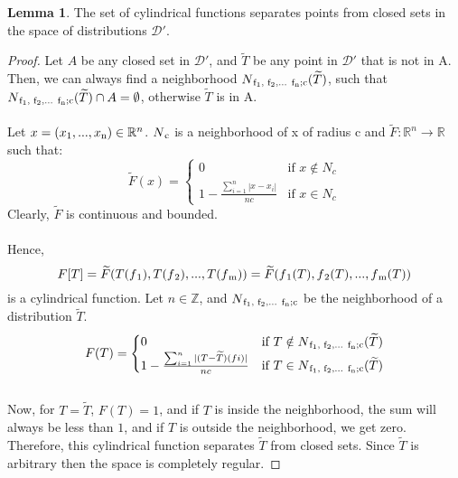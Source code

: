 \documentclass{article}
\theoremstyle{definition}
\newtheorem{lemma}{Lemma}
\begin{document}
\begin{lemma}
    The set of cylindrical functions separates points from closed sets in the space of distributions $\mathcal{D'}$.
\end{lemma}
\begin{proof}
    Let $A$ be any closed set in $\mathcal{D'}$, and $\widetilde{T}$ be any point in $\mathcal{D'}$ that is not in A. Then, we can always find a neighborhood $N\textsubscript{f\textsubscript{1}, f\textsubscript{2},... f\textsubscript{n};c}(\widetilde{T})$, such that $N\textsubscript{f\textsubscript{1}, f\textsubscript{2},... f\textsubscript{n};c}(\widetilde{T}) \cap A = \emptyset$, otherwise $\widetilde{T}$ is in A.\\\\
    Let $x=(x\textsubscript{1},..., x\textsubscript{n}) \in \mathbb{R}^n$. $N\textsubscript{c}$ is a neighborhood of x of radius c and $\widetilde{F} : \mathbb{R}^n \rightarrow \mathbb{R}$
such that: 
\[
\widetilde{F}(x) =
\begin{cases}
    0 & \text{if } x \notin N_c \\
    1 - \frac{\sum_{i=1}^{n} |x-x_i|}{nc} & \text{if } x \in N_c
\end{cases}
\]
Clearly, $\widetilde{F}$ is continuous and bounded.\\\\ Hence, 
\[
F[T] = \widetilde{F} (T(f\textsubscript{1}), T(f\textsubscript{2}), ..., T(f\textsubscript{m})) = \widetilde{F} (f\textsubscript{1}(T), f\textsubscript{2}(T), ..., f\textsubscript{m}(T)) 
\] is a cylindrical function.
Let $n\in \mathbb{Z}$, and $N\textsubscript{f\textsubscript{1}, f\textsubscript{2},... f\textsubscript{n};c}$ be the neighborhood of a distribution $\widetilde{T}$. \\
\[
F(T) =
\begin{cases}
    0 & \text{if } T \notin N\textsubscript{f\textsubscript{1}, f\textsubscript{2},... f\textsubscript{n};c}(\widetilde{T})\\
    1 - \frac{\sum_{i=1}^{n} |(T-\widetilde{T})(fi)|}{nc} & \text{if } T \in N\textsubscript{f\textsubscript{1}, f\textsubscript{2},... f\textsubscript{n};c}(\widetilde{T})
\end{cases}
\]\\
Now, for $T = \widetilde{T}$, $F(T) = 1$, and if $T$ is inside the neighborhood, the sum will always be less than $1$, and if $T$ is outside the neighborhood, we get zero.\\

Therefore, this cylindrical function separates $\widetilde{T}$ from closed sets. Since $\widetilde{T}$ is arbitrary then the space is completely regular.

\end{proof}
\end{document}

